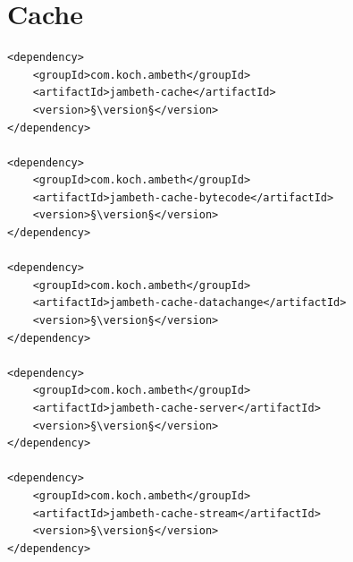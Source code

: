 \section{Cache}
\label{module:Cache}
\ClearAPI
\TODO
\begin{lstlisting}[style=POM,caption={Maven modules to use \emph{Ambeth Cache}}]
<dependency>
	<groupId>com.koch.ambeth</groupId>
	<artifactId>jambeth-cache</artifactId>
	<version>§\version§</version>
</dependency>

<dependency>
	<groupId>com.koch.ambeth</groupId>
	<artifactId>jambeth-cache-bytecode</artifactId>
	<version>§\version§</version>
</dependency>

<dependency>
	<groupId>com.koch.ambeth</groupId>
	<artifactId>jambeth-cache-datachange</artifactId>
	<version>§\version§</version>
</dependency>

<dependency>
	<groupId>com.koch.ambeth</groupId>
	<artifactId>jambeth-cache-server</artifactId>
	<version>§\version§</version>
</dependency>

<dependency>
	<groupId>com.koch.ambeth</groupId>
	<artifactId>jambeth-cache-stream</artifactId>
	<version>§\version§</version>
</dependency>
\end{lstlisting}
